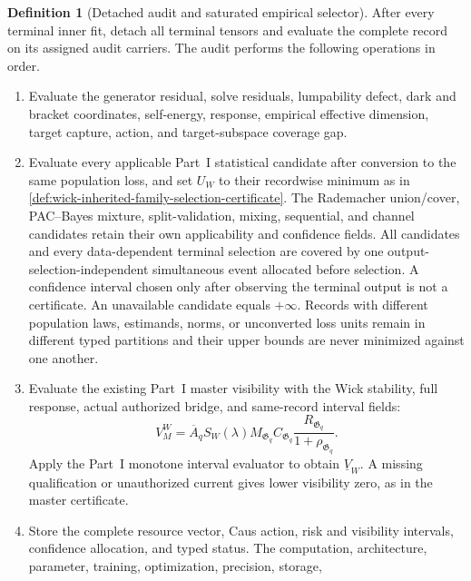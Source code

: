 \documentclass[11pt]{article}
\numberwithin{section}{part}
\theoremstyle{plain}
\theoremstyle{definition}
\newtheorem{definition}[definition]{Definition}
\theoremstyle{remark}
\begin{document}
\begin{definition}[Detached audit and saturated empirical selector]
\label{def:wick-detached-empirical-selector}
After every terminal inner fit, detach all terminal tensors and evaluate the
complete record on its assigned audit carriers.  The audit performs the
following operations in order.
\begin{enumerate}[label=\textup{(A\arabic*)}]
\item Evaluate the generator residual, solve residuals, lumpability defect,
      dark and bracket coordinates, self-energy, response, empirical
      effective dimension, target capture, action, and target-subspace
      coverage gap.
\item Evaluate every applicable Part~I statistical candidate after conversion
      to the same population loss, and set \(U_W\) to their recordwise
      minimum as in
      \cref{def:wick-inherited-family-selection-certificate}.  The
      Rademacher union/cover, PAC--Bayes mixture, split-validation, mixing,
      sequential, and channel candidates retain their own applicability and
      confidence fields.  All candidates and every data-dependent terminal
      selection are covered by one output-selection-independent simultaneous
      event allocated before selection.  A confidence interval chosen only
      after observing the terminal output is not a certificate.  An
      unavailable candidate equals \(+\infty\).  Records with different
      population laws, estimands, norms, or unconverted loss units remain in
      different typed partitions and their upper bounds are never minimized
      against one another.
\item Evaluate the existing Part~I master visibility with the Wick stability,
      full response, actual authorized bridge, and same-record interval
      fields:
      \begin{equation}
       \label{eq:wick-empirical-master-visibility}
       V_M^W
       =\overline A_q S_W(\lambda)M_{\mathfrak G_q}
        C_{\mathfrak G_q}
        \frac{R_{\mathfrak G_q}}{1+\rho_{\mathfrak G_q}}.
      \end{equation}
      Apply the Part~I monotone interval evaluator to obtain
      \(\underline V_W\).  A missing qualification or unauthorized current
      gives lower visibility zero, as in the master certificate.
\item Store the complete resource vector, Caus action, risk and visibility
      intervals, confidence allocation, and typed status.  The computation,
      architecture, parameter, training, optimization, precision, storage,

\end{enumerate}
\end{definition}
\end{document}
